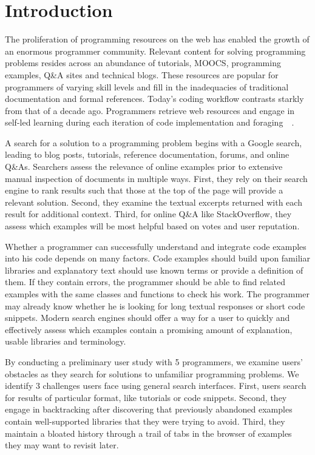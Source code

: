\section{Introduction}

The proliferation of programming resources on the web has enabled the growth of an enormous programmer community.
Relevant content for solving programming problems resides across an abundance of tutorials, MOOCS, programming examples, Q\&A sites and technical blogs.
These resources are popular for programmers of varying skill levels and fill in the inadequacies of traditional documentation and formal references.
Today's coding workflow contrasts starkly from that of a decade ago.
Programmers retrieve web resources and engage in self-led learning during each iteration of code implementation and foraging~\cite{brandt_two_2009}~\cite{brandt_example-centric_2010}.

A search for a solution to a programming problem begins with a Google search, leading to blog posts, tutorials, reference documentation, forums, and online Q\&As.
Searchers assess the relevance of online examples prior to extensive manual inspection of documents in multiple ways.
First, they rely on their search engine to rank results such that those at the top of the page will provide a relevant solution.
Second, they examine the textual excerpts returned with each result for additional context.
Third, for online Q\&A like StackOverflow, they assess which examples will be most helpful based on votes and user reputation.

Whether a programmer can successfully understand and integrate code examples into his code depends on many factors.
Code examples should build upon familiar libraries and explanatory text should use known terms or provide a definition of them.
If they contain errors, the programmer should be able to find related examples with the same classes and functions to check his work.
The programmer may already know whether he is looking for long textual responses or short code snippets. 
Modern search engines should offer a way for a user to quickly and effectively assess which examples contain a promising amount of explanation, usable libraries and terminology.

By conducting a preliminary user study with 5 programmers, we examine users' obstacles as they search for solutions to unfamiliar programming problems.
We identify 3 challenges users face using general search interfaces.
First, users search for results of particular format, like tutorials or code snippets.
Second, they engage in backtracking after discovering that previously abandoned examples contain well-supported libraries that they were trying to avoid.
Third, they maintain a bloated history through a trail of tabs in the browser of examples they may want to revisit later.

